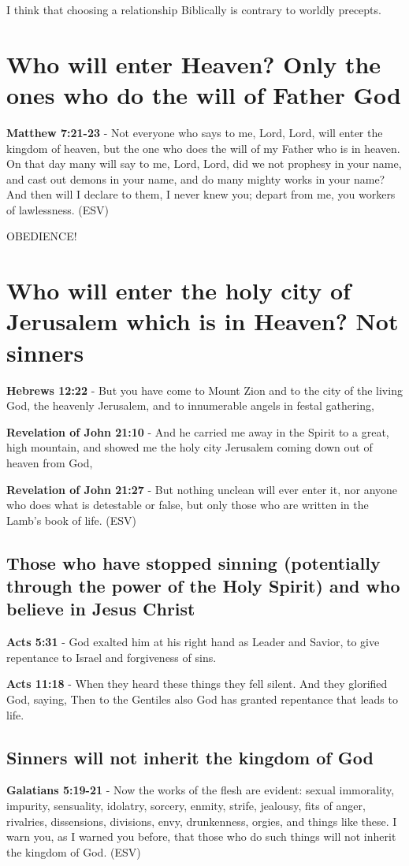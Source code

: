 \documentclass[11pt]{article}
\begin{document}
I think that choosing a relationship Biblically is contrary to worldly precepts.

\section{Who will enter Heaven? Only the ones who do the will of Father God}
\label{sec:orgab45280}
\textbf{Matthew 7:21-23} - Not everyone who says to me, Lord, Lord, will enter the kingdom of heaven, but the one who does the will of my Father who is in heaven. On that day many will say to me, Lord, Lord, did we not prophesy in your name, and cast out demons in your name, and do many mighty works in your name? And then will I declare to them, I never knew you; depart from me, you workers of lawlessness. (ESV)

OBEDIENCE!

\section{Who will enter the holy city of Jerusalem which is in Heaven? Not sinners}
\label{sec:orga1e9666}
\textbf{Hebrews 12:22} - But you have come to Mount Zion and to the city of the living God, the heavenly Jerusalem, and to innumerable angels in festal gathering,

\textbf{Revelation of John 21:10} - And he carried me away in the Spirit to a great, high mountain, and showed me the holy city Jerusalem coming down out of heaven from God,

\textbf{Revelation of John 21:27} -  But nothing unclean will ever enter it, nor anyone who does what is detestable or false, but only those who are written in the Lamb's book of life.  (ESV)

\subsection{Those who have stopped sinning (potentially through the power of the Holy Spirit) and who believe in Jesus Christ}
\label{sec:org2e8d3cf}
\textbf{Acts 5:31} - God exalted him at his right hand as Leader and Savior, to give repentance to Israel and forgiveness of sins.

\textbf{Acts 11:18} - When they heard these things they fell silent. And they glorified God, saying, Then to the Gentiles also God has granted repentance that leads to life.

\subsection{Sinners will not inherit the kingdom of God}
\label{sec:orgb1fab81}
\textbf{Galatians 5:19-21} -  Now the works of the flesh are evident: sexual immorality, impurity, sensuality, idolatry, sorcery, enmity, strife, jealousy, fits of anger, rivalries, dissensions, divisions, envy, drunkenness, orgies, and things like these.  I warn you, as I warned you before, that those who do such things will not inherit the kingdom of God.  (ESV)
\end{document}
